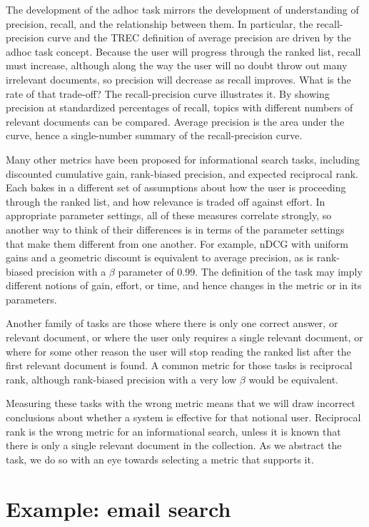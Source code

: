 \documentclass[nobib]{tufte-book}
\begin{document}
The development of the adhoc task mirrors the development of understanding of precision, recall, and the relationship between them.  In particular, the recall-precision curve and the TREC definition of average precision are driven by the adhoc task concept.  Because the user will progress through the ranked list, recall must increase, although along the way the user will no doubt throw out many irrelevant documents, so precision will decrease as recall improves.  What is the rate of that trade-off?  The recall-precision curve illustrates it.  By showing precision at standardized percentages of recall, topics with different numbers of relevant documents can be compared.  Average precision is the area under the curve, hence a single-number summary of the recall-precision curve.

Many other metrics have been proposed for informational search tasks, including discounted cumulative gain, rank-biased precision, and expected reciprocal rank.  Each bakes in a different set of assumptions about how the user is proceeding through the ranked list, and how relevance is traded off against effort.  In appropriate parameter settings, all of these measures correlate strongly, so another way to think of their differences is in terms of the parameter settings that make them different from one another.  For example, nDCG with uniform gains and a geometric discount is equivalent to average precision, as is rank-biased precision with a $\beta$ parameter of 0.99.  The definition of the task may imply different notions of gain, effort, or time, and hence changes in the metric or in its parameters.

Another family of tasks are those where there is only one correct answer, or relevant document, or where the user only requires a single relevant document, or where for some other reason the user will stop reading the ranked list after the first relevant document is found.  A common metric for those tasks is reciprocal rank, although rank-biased precision with a very low $\beta$ would be equivalent.

Measuring these tasks with the wrong metric means that we will draw incorrect conclusions about whether a system is effective for that notional user.  Reciprocal rank is the wrong metric for an informational search, unless it is known that there is only a single relevant document in the collection.  As we abstract the task, we do so with an eye towards selecting a metric that supports it.

\section{Example: email search}
\end{document}
